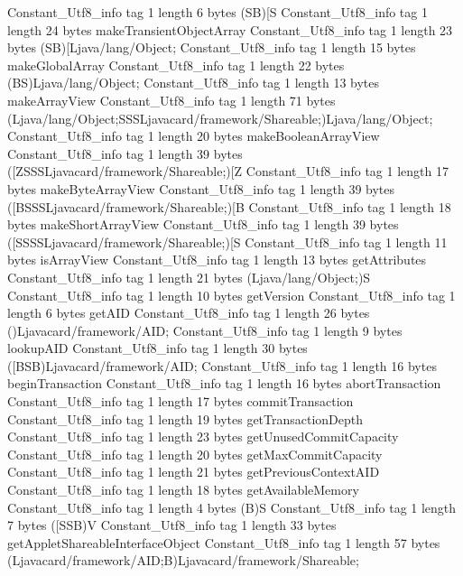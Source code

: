 {{{		}
		Constant_Utf8_info {
			tag	1
			length	6
			bytes	(SB)[S
		}
		Constant_Utf8_info {
			tag	1
			length	24
			bytes	makeTransientObjectArray
		}
		Constant_Utf8_info {
			tag	1
			length	23
			bytes	(SB)[Ljava/lang/Object;
		}
		Constant_Utf8_info {
			tag	1
			length	15
			bytes	makeGlobalArray
		}
		Constant_Utf8_info {
			tag	1
			length	22
			bytes	(BS)Ljava/lang/Object;
		}
		Constant_Utf8_info {
			tag	1
			length	13
			bytes	makeArrayView
		}
		Constant_Utf8_info {
			tag	1
			length	71
			bytes	(Ljava/lang/Object;SSSLjavacard/framework/Shareable;)Ljava/lang/Object;
		}
		Constant_Utf8_info {
			tag	1
			length	20
			bytes	makeBooleanArrayView
		}
		Constant_Utf8_info {
			tag	1
			length	39
			bytes	([ZSSSLjavacard/framework/Shareable;)[Z
		}
		Constant_Utf8_info {
			tag	1
			length	17
			bytes	makeByteArrayView
		}
		Constant_Utf8_info {
			tag	1
			length	39
			bytes	([BSSSLjavacard/framework/Shareable;)[B
		}
		Constant_Utf8_info {
			tag	1
			length	18
			bytes	makeShortArrayView
		}
		Constant_Utf8_info {
			tag	1
			length	39
			bytes	([SSSSLjavacard/framework/Shareable;)[S
		}
		Constant_Utf8_info {
			tag	1
			length	11
			bytes	isArrayView
		}
		Constant_Utf8_info {
			tag	1
			length	13
			bytes	getAttributes
		}
		Constant_Utf8_info {
			tag	1
			length	21
			bytes	(Ljava/lang/Object;)S
		}
		Constant_Utf8_info {
			tag	1
			length	10
			bytes	getVersion
		}
		Constant_Utf8_info {
			tag	1
			length	6
			bytes	getAID
		}
		Constant_Utf8_info {
			tag	1
			length	26
			bytes	()Ljavacard/framework/AID;
		}
		Constant_Utf8_info {
			tag	1
			length	9
			bytes	lookupAID
		}
		Constant_Utf8_info {
			tag	1
			length	30
			bytes	([BSB)Ljavacard/framework/AID;
		}
		Constant_Utf8_info {
			tag	1
			length	16
			bytes	beginTransaction
		}
		Constant_Utf8_info {
			tag	1
			length	16
			bytes	abortTransaction
		}
		Constant_Utf8_info {
			tag	1
			length	17
			bytes	commitTransaction
		}
		Constant_Utf8_info {
			tag	1
			length	19
			bytes	getTransactionDepth
		}
		Constant_Utf8_info {
			tag	1
			length	23
			bytes	getUnusedCommitCapacity
		}
		Constant_Utf8_info {
			tag	1
			length	20
			bytes	getMaxCommitCapacity
		}
		Constant_Utf8_info {
			tag	1
			length	21
			bytes	getPreviousContextAID
		}
		Constant_Utf8_info {
			tag	1
			length	18
			bytes	getAvailableMemory
		}
		Constant_Utf8_info {
			tag	1
			length	4
			bytes	(B)S
		}
		Constant_Utf8_info {
			tag	1
			length	7
			bytes	([SSB)V
		}
		Constant_Utf8_info {
			tag	1
			length	33
			bytes	getAppletShareableInterfaceObject
		}
		Constant_Utf8_info {
			tag	1
			length	57
			bytes	(Ljavacard/framework/AID;B)Ljavacard/framework/Shareable;
}}}
